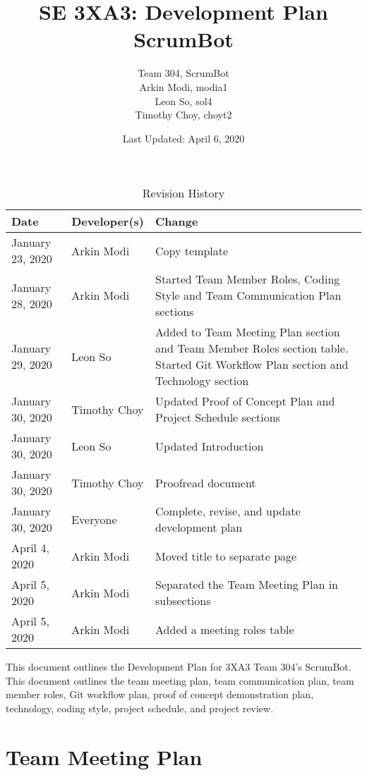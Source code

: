 \documentclass[12pt, titlepage]{article}
\title{SE 3XA3: Development Plan\\ScrumBot}
\author{
    Team 304, ScrumBot
        \\ Arkin Modi, modia1
        \\ Leon So, sol4
        \\ Timothy Choy, choyt2
}
\date{Last Updated: April 6, 2020}
\begin{document}
\maketitle
{}
\newpage

\begin{table}[H]
    \caption{Revision History} \label{TblRevisionHistory}
    \begin{tabularx}{\textwidth}{llX}
        \toprule
            \textbf{Date} & \textbf{Developer(s)} & \textbf{Change}\\
        \midrule
            January 23, 2020 & Arkin Modi & Copy template\\
            January 28, 2020 & Arkin Modi & Started Team Member Roles, Coding Style and Team Communication Plan sections\\
            January 29, 2020 & Leon So & Added to Team Meeting Plan section and Team Member Roles section table. Started Git Workflow Plan section and Technology section\\
            January 30, 2020 & Timothy Choy & Updated Proof of Concept Plan and Project Schedule sections\\
            January 30, 2020 & Leon So & Updated Introduction\\
            January 30, 2020 & Timothy Choy & Proofread document\\
            January 30, 2020 & Everyone & Complete, revise, and update development plan\\
            April 4, 2020 & Arkin Modi & Moved title to separate page\\
            April 5, 2020 & Arkin Modi & Separated the Team Meeting Plan in subsections\\
            April 5, 2020 & Arkin Modi & Added a meeting roles table\\
        \bottomrule
    \end{tabularx}
\end{table}

\newpage
{}

\noindent This document outlines the Development Plan for 3XA3 Team 304's ScrumBot. This document outlines the team meeting plan, team communication plan, team member roles, Git workflow plan, proof of concept demonstration plan, technology, coding style, project schedule, and project review.

\section{Team Meeting Plan}
\end{document}
